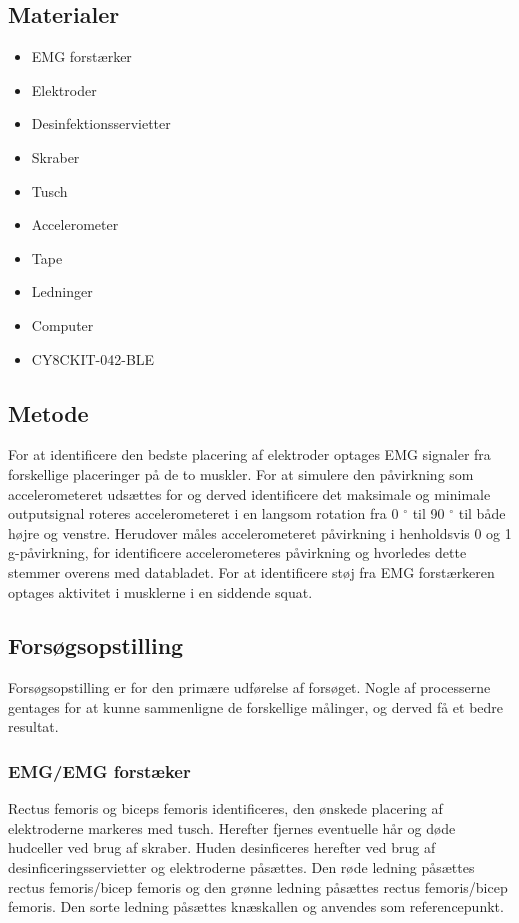 \subsection{Materialer}  
\begin{itemize}
\item EMG forstærker
\item Elektroder
\item Desinfektionsservietter
\item Skraber
\item Tusch 

\item Accelerometer
\item Tape
\item Ledninger

\item Computer
\item CY8CKIT-042-BLE
\end{itemize}

\subsection{Metode}

For at identificere den bedste placering af elektroder optages EMG signaler fra forskellige placeringer på de to muskler. 
For at simulere den påvirkning som accelerometeret udsættes for og derved identificere det maksimale og minimale outputsignal roteres accelerometeret i en langsom rotation fra 0 $^{\circ}$ til 90 $^{\circ}$  til både højre og venstre. Herudover måles accelerometeret påvirkning i henholdsvis 0 og 1 g-påvirkning, for identificere accelerometeres påvirkning og hvorledes dette stemmer overens med databladet. 
For at identificere støj fra EMG forstærkeren optages aktivitet i musklerne i en siddende squat.
 

\subsection{Forsøgsopstilling}
Forsøgsopstilling er for den primære udførelse af forsøget. Nogle af processerne gentages for at kunne sammenligne de forskellige målinger, og derved få et bedre resultat.

\subsubsection{EMG/EMG forstæker}
Rectus femoris og biceps femoris identificeres, den ønskede placering af elektroderne markeres med tusch. Herefter fjernes eventuelle hår og døde hudceller ved brug af skraber. Huden desinficeres herefter ved brug af desinficeringsservietter og elektroderne påsættes. Den røde ledning påsættes rectus femoris/bicep femoris og den grønne ledning påsættes rectus femoris/bicep femoris. Den sorte ledning påsættes knæskallen og anvendes som referencepunkt.

